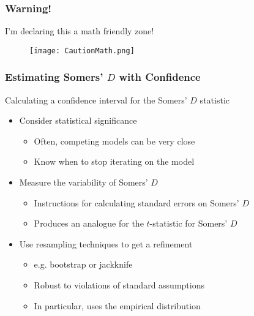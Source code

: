 \documentclass{beamer}
\begin{document}

\begin{frame}
\frametitle{Warning!}

I'm declaring this a math friendly zone!
\begin{figure}
    \texttt{[image: CautionMath.png]}
\end{figure}

\end{frame}



\begin{frame}
\frametitle{Estimating Somers' $D$ with Confidence}

Calculating a confidence interval for the Somers' $D$ statistic
\begin{itemize}
    \item Consider statistical significance
    \begin{itemize}
        \item Often, competing models can be very close
        \item Know when to stop iterating on the model
    \end{itemize}
    \item Measure the variability of Somers' $D$
    \begin{itemize}
        \item Instructions for calculating standard errors on Somers' $D$
        \item Produces an analogue for the $t$-statistic for Somers' $D$
    \end{itemize}
    \item Use resampling techniques to get a refinement
    \begin{itemize}
        \item e.g. bootstrap or jackknife
        \item Robust to violations of standard assumptions
        \item In particular, uses the empirical distribution
    \end{itemize}
\end{itemize}

\end{frame}
\end{document}
